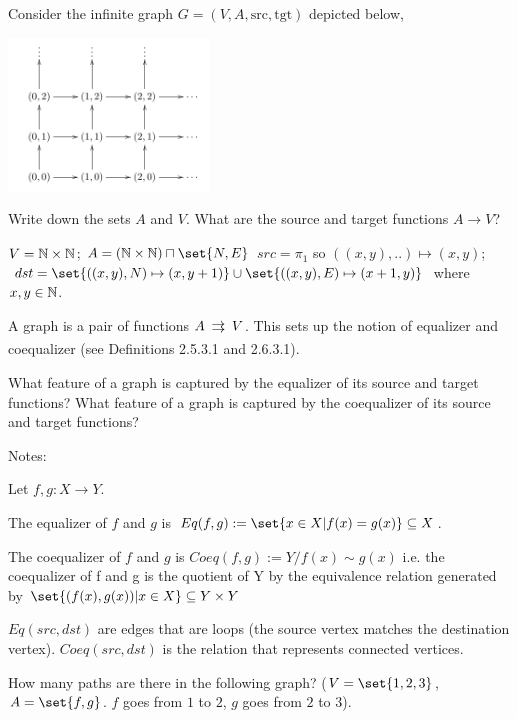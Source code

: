 \documentclass{article}
\begin{document}

Consider the infinite graph $G = (V, A, \text{src}, \text{tgt})$ depicted below,

\begin{center}
\includegraphics[width=0.4\textwidth]{img/ex33111.png}
\end{center}

\es Write down the sets $A$ and $V$.
\ei What are the source and target functions $A \to V$?
\ee

\ans

\es $V = \mathbb{N} \times \mathbb{N}$; $A = (\N \times \N) \sqcap \set{N,E}$
\ei $src = \pi_1$ so $((x,y),..) \mapsto (x,y)$;
    $dst = \set{ ((x,y),N) \mapsto (x,y+1)} \cup \set{ ((x,y),E) \mapsto
    (x+1,y)}$ where $x,y \in \mathbb{N}$.
\ee


A graph is a pair of functions $A \toto V$. This sets up the notion of
equalizer and coequalizer (see Definitions 2.5.3.1 and 2.6.3.1).

\es What feature of a graph is captured by the equalizer of its source and
    target functions?
\ei What feature of a graph is captured by the coequalizer of its source and
    target functions?
\ee


\ans

Notes:

\ls Let $f,g: X \to Y$.

\li The equalizer of $f$ and $g$ is $Eq(f,g) := \set{x \in X | f(x) = g(x)}
    \subseteq X$.

\li The coequalizer of $f$ and $g$ is $Coeq(f,g) := Y / f(x) \sim
    g(x)$ i.e.  the coequalizer of f and g is the quotient of Y by the
    equivalence relation generated by $\set{(f(x),g(x)) | x \in X} \subseteq Y
    \times Y$
\le

\es $Eq(src,dst)$ are edges that are loops (the source vertex matches the
    destination vertex).
\ei $Coeq(src,dst)$ is the relation that represents connected vertices.
\ee


How many paths are there in the following graph? ($V=\set{1,2,3}$,
$A=\set{f,g}$. $f$ goes from $1$ to $2$, $g$ goes from $2$ to $3$).
\end{document}
